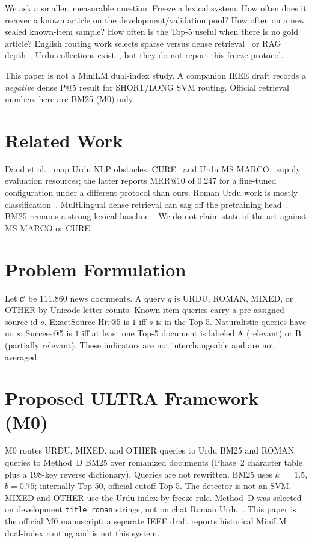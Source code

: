 \documentclass[conference]{IEEEtran}
\begin{document}
We ask a smaller, measurable question. Freeze a lexical system. How often does it recover a known article on the development/validation pool? How often on a new sealed known-item sample? How often is the Top-5 useful when there is no gold article? English routing work selects sparse versus dense retrieval~\cite{arabzadeh2021predicting} or RAG depth~\cite{jeong2024adaptiverag}. Urdu collections exist~\cite{iqbal2021cure,butt2024urdumsmarco}, but they do not report this freeze protocol.

This paper is not a MiniLM dual-index study. A companion IEEE draft records a \emph{negative} dense P@5 result for SHORT/LONG SVM routing. Official retrieval numbers here are BM25 (M0) only.

\section{Related Work}

Daud et al.~\cite{daud2017urdu} map Urdu NLP obstacles. CURE~\cite{iqbal2021cure} and Urdu MS MARCO~\cite{butt2024urdumsmarco} supply evaluation resources; the latter reports MRR@10 of 0.247 for a fine-tuned configuration under a different protocol than ours. Roman Urdu work is mostly classification~\cite{hussain2025qlora,mehmood2020xtreme}. Multilingual dense retrieval can sag off the pretraining head~\cite{wu2024crosslingual,conneau2020xlmr}. BM25 remains a strong lexical baseline~\cite{robertson2009bm25}. We do not claim state of the art against MS MARCO or CURE.

\section{Problem Formulation}

Let $\mathcal{C}$ be 111{,}860 news documents. A query $q$ is URDU, ROMAN, MIXED, or OTHER by Unicode letter counts. Known-item queries carry a pre-assigned source id $s$. ExactSource Hit@5 is $1$ iff $s$ is in the Top-5. Naturalistic queries have no $s$; Success@5 is $1$ iff at least one Top-5 document is labeled A (relevant) or B (partially relevant). These indicators are not interchangeable and are not averaged.

\section{Proposed ULTRA Framework (M0)}

M0 routes URDU, MIXED, and OTHER queries to Urdu BM25 and ROMAN queries to Method~D BM25 over romanized documents (Phase~2 character table plus a 198-key reverse dictionary). Queries are not rewritten. BM25 uses $k_1=1.5$, $b=0.75$; internally Top-50, official cutoff Top-5. The detector is not an SVM. MIXED and OTHER use the Urdu index by freeze rule. Method~D was selected on development \texttt{title\_roman} strings, not on chat Roman Urdu~\cite{robertson2009bm25}. This paper is the official M0 manuscript; a separate IEEE draft reports historical MiniLM dual-index routing and is not this system.
\end{document}

